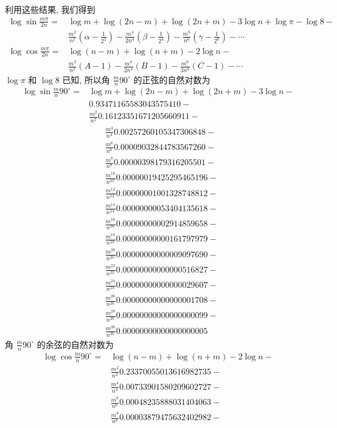 利用这些结果, 我们得到
\[
\begin{aligned}
\log \sin \frac{m \pi}{2 n}= & \log m+\log (2 n-m)+\log (2 n+m)-3 \log n+\log \pi-\log 8- \\
& \frac{m^{2}}{n^{2}}\left(\alpha-\frac{1}{2^{2}}\right)-\frac{m^{4}}{2 n^{4}}\left(\beta-\frac{1}{2^{4}}\right)-\frac{m^{6}}{n^{6}}\left(\gamma-\frac{1}{2^{6}}\right)-\cdots \\
\log \cos \frac{m \pi}{2 n}= & \log (n-m)+\log (n+m)-2 \log n- \\
& \frac{m^{2}}{n^{2}}(A-1)-\frac{m^{4}}{2 n^{4}}(B-1)-\frac{m^{6}}{3 n^{6}}(C-1)-\cdots
\end{aligned}
\]
$\log \pi$ 和 $\log 8$ 已知, 所以角 $\frac{m}{n} 90^{\circ}$ 的正弦的自然对数为
\[
\begin{aligned}
\log \sin \frac{m}{n} 90^{\circ}= & \log m+\log (2 n-m)+\log (2 n+m)-3 \log n- \\
& 0.93471165583043575410- \\
& \frac{m^{2}}{n^{2}} 0.16123351671205660911-
\end{aligned}
\]
\[
\begin{aligned}
& \frac{m^{4}}{n^{4}} 0.00257260105347306848- \\
& \frac{m^{6}}{n^{6}} 0.00009032844783567260- \\
& \frac{m^{8}}{n^{8}} 0.00000398179316205501- \\
& \frac{m^{10}}{n^{10}} 0.00000019425295465196- \\
& \frac{m^{12}}{n^{12}} 0.00000001001328748812- \\
& \frac{m^{14}}{n^{14}} 0.00000000053404135618- \\
& \frac{m^{16}}{n^{16}} 0.00000000002914859658- \\
& \frac{m^{18}}{n^{18}} 0.00000000000161797979- \\
& \frac{m^{20}}{n^{20}} 0.00000000000009097690- \\
& \frac{m^{22}}{n^{22}} 0.00000000000000516827- \\
& \frac{m^{24}}{n^{24}} 0.00000000000000029607- \\
& \frac{m^{26}}{n^{26}} 0.00000000000000001708- \\
& \frac{m^{28}}{n^{28}} 0.00000000000000000099- \\
& \frac{m^{30}}{n^{30}} 0.00000000000000000005
\end{aligned}
\]
角 $\frac{m}{n} 90^{\circ}$ 的余弦的自然对数为
\[
\begin{aligned}
\log \cos \frac{m}{n} 90^{\circ}= & \log (n-m)+\log (n+m)-2 \log n- \\
& \frac{m^{2}}{n^{2}} 0.23370055013616982735- \\
& \frac{m^{4}}{n^{4}} 0.00733901580209602727- \\
& \frac{m^{6}}{n^{6}} 0.00048235888031404063- \\
& \frac{m^{8}}{n^{8}} 0.00003879475632402982-
\end{aligned}
\]
